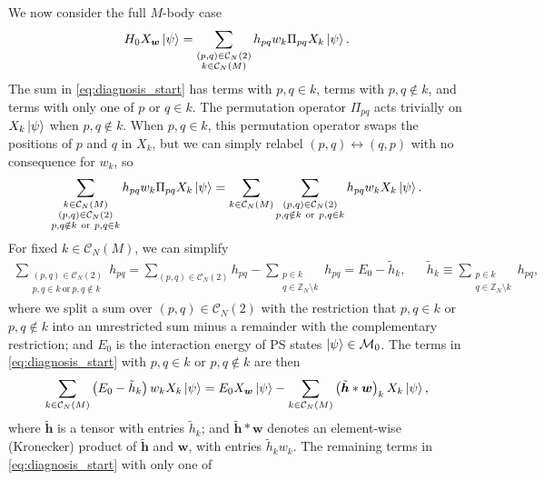 \documentclass[nofootinbib,notitlepage,11pt]{revtex4-2}
\renewcommand{\t}{\text} %
\newcommand{\p}[1]{\left(#1\right)} %
\newcommand{\m}{\bm} %
\newcommand{\1}{\mathds{1}}
\newcommand{\C}{\mathcal{C}}
\newcommand{\M}{\mathcal{M}}
\newcommand{\ZZ}{\mathbb{Z}}
\begin{document}
We now consider the full $M$-body case
\begin{align}
  H_0 X_{\m w} \ket\psi
  = \sum_{\substack{\p{p,q}\in\C_N\p{2}\\k\in\C_N\p{M}}}
  h_{pq} w_k \Pi_{pq} X_k \ket\psi.
  \label{eq:diagnosis_start}
\end{align}
The sum in \eqref{eq:diagnosis_start} has terms with $p,q\in k$, terms
with $p,q\notin k$, and terms with only one of $p$ or $q\in k$.  The
permutation operator $\Pi_{pq}$ acts trivially on $X_k\ket\psi$ when
$p,q\notin k$.  When $p,q\in k$, this permutation operator swaps the
positions of $p$ and $q$ in $X_k$, but we can simply relabel
$\p{p,q}\leftrightarrow\p{q,p}$ with no consequence for $w_k$, so
\begin{align}
  \sum_{\substack{k\in\C_N\p{M}\\\p{p,q}\in\C_N\p{2}\\
      p,q\notin k~\t{or}~p,q\in k}}
  h_{pq} w_k \Pi_{pq} X_k \ket\psi
  = \sum_{k\in\C_N\p{M}}
  \sum_{\substack{\p{p,q}\in\C_N\p{2}\\p,q\notin k~\t{or}~p,q\in k}}
  h_{pq} w_k X_k \ket\psi.
\end{align}
For fixed $k\in\C_N\p{M}$, we can simplify
\begin{align}
  \sum_{\substack{\p{p,q}\in\C_N\p{2}\\p,q\in k~\t{or}~p,q\notin k}} h_{pq}
  = \sum_{\p{p,q}\in\C_N\p{2}} h_{pq}
  - \sum_{\substack{p\in k\\q\in\ZZ_N\setminus k}} h_{pq}
  = E_0 - \tilde h_k,
  &&
  \tilde h_k \equiv \sum_{\substack{p\in k\\q\in\ZZ_N\setminus k}} h_{pq},
\end{align}
where we split a sum over $\p{p,q}\in\C_N\p{2}$ with the restriction
that $p,q\in k$ or $p,q\notin k$ into an unrestricted sum minus a
remainder with the complementary restriction; and $E_0$ is the
interaction energy of PS states $\ket\psi\in\M_0$.  The terms in
\eqref{eq:diagnosis_start} with $p,q\in k$ or $p,q\notin k$ are then
\begin{align}
  \sum_{k\in\C_N\p{M}} \p{E_0 - \tilde h_k} w_k X_k \ket\psi
  = E_0 X_{\m w} \ket\psi
  - \sum_{k\in\C_N\p{M}} \p{\tilde{\m h} * \m w}_k X_k \ket\psi,
\end{align}
where $\tilde{\m h}$ is a tensor with entries $\tilde h_k$; and
$\tilde{\m h} * \m w$ denotes an element-wise (Kronecker) product of
$\tilde{\m h}$ and $\m w$, with entries $\tilde h_k w_k$.  The
remaining terms in \eqref{eq:diagnosis_start} with only one of
\end{document}
